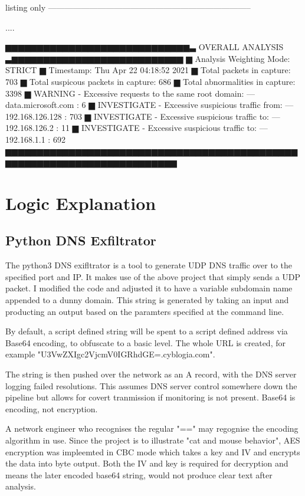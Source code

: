 \begin{tcblisting}{listing only}
--------------------------------------------------------------------------

....

▆▆▆▆▆▆▆▆▆▆▆▆▆▆▆▆▆▆▆▆▆▆▆▆▆▆▆▆▆▃ OVERALL ANALYSIS ▃▆▆▆▆▆▆▆▆▆▆▆▆▆▆▆▆▆▆▆▆▆▆▆▆▆▆▆
▆ Analysis Weighting Mode: STRICT
▆ Timestamp: Thu Apr 22 04:18:52 2021
▆ Total packets in capture:  703
▆ Total suspicous packets in capture:  686
▆ Total abnormalities in capture:  3398
▆ WARNING - Excessive requests to the same root domain: --- data.microsoft.com : 6
▆ INVESTIGATE - Excessive suspicious traffic from: --- 192.168.126.128 : 703
▆ INVESTIGATE - Excessive suspicious traffic to: --- 192.168.126.2 : 11
▆ INVESTIGATE - Excessive suspicious traffic to: --- 192.168.1.1 : 692
▆▆▆▆▆▆▆▆▆▆▆▆▆▆▆▆▆▆▆▆▆▆▆▆▆▆▆▆▆▆▆▆▆▆▆▆▆▆▆▆▆▆▆▆▆▆▆▆▆▆▆▆▆▆▆▆▆▆▆▆▆▆▆▆▆▆▆▆▆▆▆▆▆

\end{tcblisting}


\section{Logic Explanation}
\subsection{Python DNS Exfiltrator}
The python3 DNS exifltrator is a tool to generate UDP DNS traffic over to the specified port and IP. It makes use of the above project that simply sends a UDP packet. I modified the code and adjusted it to have a variable subdomain name appended to a dunny domain.
This string is generated by taking an input and producting an output based on the paramters specified at the command line. 

By default, a script defined string will be spent to a script defined address via Base64 encoding, to obfuscate to a basic level. The whole URL is created,
for example "U3VwZXIgc2VjcmV0IGRhdGE=.cyblogia.com". 

The string is then pushed over the network as an A record, with the DNS server logging failed resolutions. This assumes DNS server control somewhere down the pipeline but allows for covert tranmission if monitoring is not present.
Base64 is encoding, not encryption. 

A network engineer who recognises the regular "==" may regognise the encoding algorithm in use. Since the project is to illustrate "cat and mouse behavior", AES encryption was impleemted in CBC mode which takes a key and IV and encrypts the data into byte output.
Both the IV and key is required for decryption and means the later encoded base64 string, would not produce clear text after analysis. 

